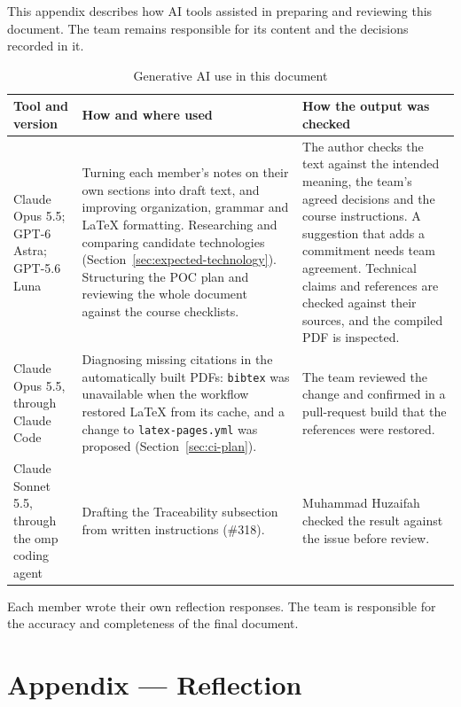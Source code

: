 \documentclass{article}
\begin{document}
This appendix describes how AI tools assisted in preparing and
reviewing this document. The team remains responsible for its
content and the decisions recorded in it.

\begin{table}[h]
\centering
\caption{Generative AI use in this document}
\label{tab:ai-disclosure}
\begin{tabularx}{\textwidth}{@{}>{\raggedright\arraybackslash}p{}YY@{}}
\toprule
\textbf{Tool and version} & \textbf{How and where used} & \textbf{How the output was checked}\\
\midrule
Claude Opus 5.5; GPT-6 Astra; GPT-5.6 Luna &
Turning each member's notes on their own sections into draft text, and
improving organization, grammar and \LaTeX{} formatting. Researching and
comparing candidate technologies (Section~\ref{sec:expected-technology}).
Structuring the POC plan and reviewing the whole document against the course
checklists. &
The author checks the text against the intended meaning, the team's agreed
decisions and the course instructions. A suggestion that adds a commitment
needs team agreement. Technical claims and references are checked against
their sources, and the compiled PDF is inspected.\\
\addlinespace
Claude Opus 5.5, through Claude Code &
Diagnosing missing citations in the automatically built PDFs: \texttt{bibtex}
was unavailable when the workflow restored \LaTeX{} from its cache, and a
change to \texttt{latex-pages.yml} was proposed
(Section~\ref{sec:ci-plan}). &
The team reviewed the change and confirmed in a pull-request build that the
references were restored.\\
\addlinespace
Claude Sonnet 5.5, through the omp coding agent &
Drafting the Traceability subsection from written instructions (\#318). &
Muhammad Huzaifah checked the result against the issue before review.\\
\bottomrule
\end{tabularx}
\end{table}

Each member wrote their own reflection responses. The team is responsible for
the accuracy and completeness of the final document.

\newpage{}

\section*{Appendix --- Reflection}


\end{document}
